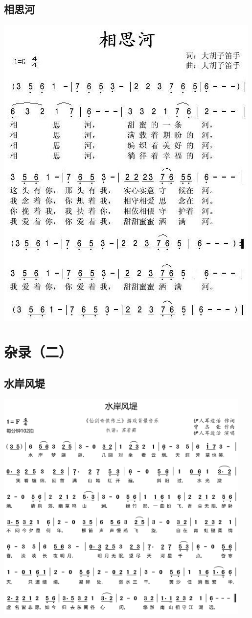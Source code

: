 \documentclass[cn,pad,twocol]{elegantbook}
\begin{document}
\section{相思河}    \includegraphics[width=\textwidth]{dongxiao/20200901-相思河.jpeg}

\chapter{杂录（二）}
\section{水岸风堤}  \includegraphics[width=0.95\textwidth]{dongxiao/20200909-水岸风堤.jpg}
\end{document}

